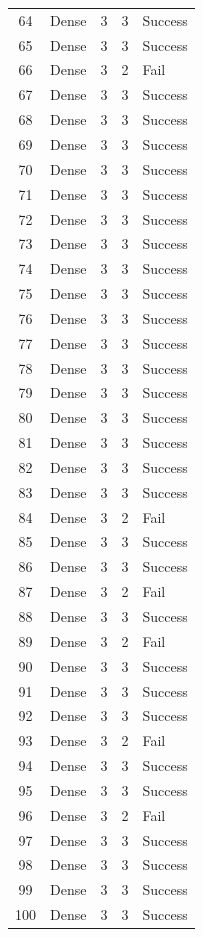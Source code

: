 \documentclass[../main.tex]{subfiles}
\begin{document}
\begin{center}
\begin{longtable}{|c|l|c|c|l|}
    64 & Dense & 3 & 3 & Success \\
    65 & Dense & 3 & 3 & Success \\
    66 & Dense & 3 & 2 & Fail \\
    67 & Dense & 3 & 3 & Success \\
    68 & Dense & 3 & 3 & Success \\
    69 & Dense & 3 & 3 & Success \\
    70 & Dense & 3 & 3 & Success \\
    71 & Dense & 3 & 3 & Success \\
    72 & Dense & 3 & 3 & Success \\
    73 & Dense & 3 & 3 & Success \\
    74 & Dense & 3 & 3 & Success \\
    75 & Dense & 3 & 3 & Success \\
    76 & Dense & 3 & 3 & Success \\
    77 & Dense & 3 & 3 & Success \\
    78 & Dense & 3 & 3 & Success \\
    79 & Dense & 3 & 3 & Success \\
    80 & Dense & 3 & 3 & Success \\
    81 & Dense & 3 & 3 & Success \\
    82 & Dense & 3 & 3 & Success \\
    83 & Dense & 3 & 3 & Success \\
    84 & Dense & 3 & 2 & Fail \\
    85 & Dense & 3 & 3 & Success \\
    86 & Dense & 3 & 3 & Success \\
    87 & Dense & 3 & 2 & Fail \\
    88 & Dense & 3 & 3 & Success \\
    89 & Dense & 3 & 2 & Fail \\
    90 & Dense & 3 & 3 & Success \\
    91 & Dense & 3 & 3 & Success \\
    92 & Dense & 3 & 3 & Success \\
    93 & Dense & 3 & 2 & Fail \\
    94 & Dense & 3 & 3 & Success \\
    95 & Dense & 3 & 3 & Success \\
    96 & Dense & 3 & 2 & Fail \\
    97 & Dense & 3 & 3 & Success \\
    98 & Dense & 3 & 3 & Success \\
    99 & Dense & 3 & 3 & Success \\
    100 & Dense & 3 & 3 & Success \\
\end{longtable}
\end{center}
\end{document}
